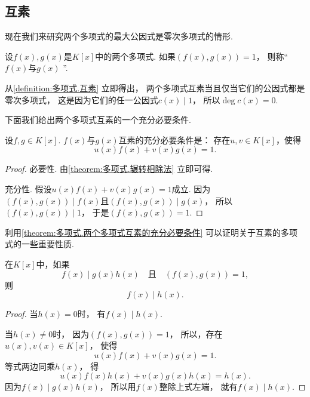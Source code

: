 \subsection{互素}
现在我们来研究两个多项式的最大公因式是零次多项式的情形.

\begin{definition}\label{definition:多项式.互素}
设\(f(x),g(x)\)是\(K[x]\)中的两个多项式.
如果\((f(x),g(x))=1\)，
则称“\(f(x)\)与\(g(x)\) ”.
\end{definition}

从\cref{definition:多项式.互素} 立即得出，
两个多项式互素当且仅当它们的公因式都是零次多项式，
这是因为它们的任一公因式\(c(x) \mid 1\)，
所以\(\deg c(x) = 0\).

下面我们给出两个多项式互素的一个充分必要条件.
\begin{theorem}\label{theorem:多项式.两个多项式互素的充分必要条件}
设\(f,g \in K[x]\).
\(f(x)\)与\(g(x)\)互素的充分必要条件是：
存在\(u,v \in K[x]\)，使得\[
	u(x) f(x) + v(x) g(x) = 1.
\]
\begin{proof}
必要性.
由\cref{theorem:多项式.辗转相除法} 立即可得.

充分性.
假设\(u(x) f(x) + v(x) g(x) = 1\)成立.
因为\((f(x),g(x)) \mid f(x)\)且\((f(x),g(x)) \mid g(x)\)，
所以\((f(x),g(x)) \mid 1\)，
于是\((f(x),g(x)) = 1\).
\end{proof}
\end{theorem}

利用\cref{theorem:多项式.两个多项式互素的充分必要条件} 可以证明关于互素的多项式的一些重要性质.

\begin{property}\label{theorem:多项式.互素.性质1}
在\(K[x]\)中，如果\[
	f(x) \mid g(x) h(x)
	\quad\text{且}\quad
	(f(x),g(x))=1,
\]
则\[
	f(x) \mid h(x).
\]
\begin{proof}
当\(h(x)=0\)时，
有\(f(x) \mid h(x)\).

当\(h(x)\neq0\)时，
因为\((f(x),g(x))=1\)，
所以，存在\(u(x),v(x) \in K[x]\)，
使得\[
	u(x) f(x) + v(x) g(x) = 1.
\]
等式两边同乘\(h(x)\)，
得\[
	u(x) f(x) h(x) + v(x) g(x) h(x) = h(x).
\]
因为\(f(x) \mid g(x) h(x)\)，
所以用\(f(x)\)整除上式左端，
就有\(f(x) \mid h(x)\).
\end{proof}
\end{property}

